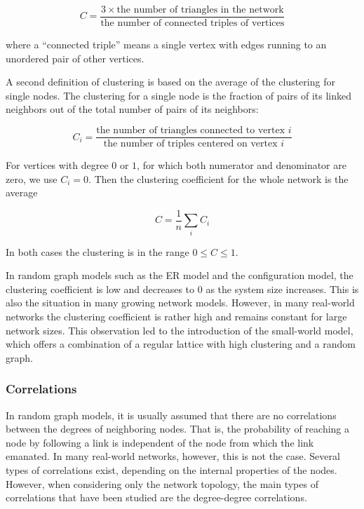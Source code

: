 \begin{equation}
    C = \frac{3 \times \text{the number of triangles in the network}}{\text{the number of connected triples of vertices}}
\end{equation}

\nd where a “connected triple” means a single vertex with edges running to an unordered
pair of other vertices. \s

\nd A second definition of clustering is based on the average of the clustering for single
nodes. The clustering for a single node is the fraction of pairs of its linked neighbors
out of the total number of pairs of its neighbors:

\begin{equation}
    C_i = \frac{\text{the number of triangles connected to vertex }i}{\text{the number of triples centered on vertex } i}
\end{equation}

\nd For vertices with degree $0$ or $1$, for which both numerator and denominator are zero, we use $C_i = 0$. Then the clustering coefficient for the whole network is the average

\begin{equation}
    C = \frac{1}{n} \sum_{i} C_i
\end{equation}

\nd In both cases the clustering is in the range $0 \leq C \leq 1$. \s

\nd In random graph models such as the ER model and the configuration model, the clustering coefficient is low and decreases to $0$ as the system size increases. This is also the situation in many growing network models. However, in many real-world networks the clustering coefficient is rather high and remains constant for large network sizes. This observation led to the introduction of the small-world model, which offers a combination of a regular lattice with high clustering and a random graph.

\subsubsection{Correlations}
In random graph models, it is usually assumed that there are no correlations between
the degrees of neighboring nodes. That is, the probability of reaching a node by
following a link is independent of the node from which the link emanated. In many
real-world networks, however, this is not the case. Several types of correlations exist, depending on the internal properties of the nodes. However, when considering only the network topology, the main types of correlations that have been studied are the degree-degree correlations. \s

